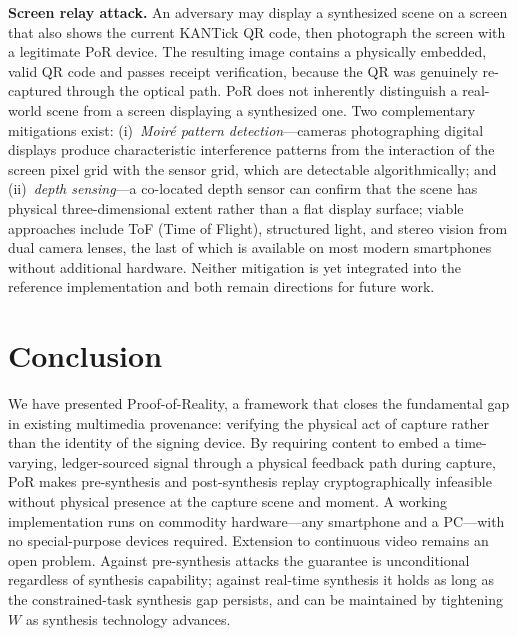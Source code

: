 \documentclass[11pt]{article}
\begin{document}
\textbf{Screen relay attack.} An adversary may display a synthesized scene on
a screen that also shows the current KANTick QR code, then photograph the screen
with a legitimate PoR device. The resulting image contains a physically embedded,
valid QR code and passes receipt verification, because the QR was genuinely
re-captured through the optical path. PoR does not inherently distinguish a
real-world scene from a screen displaying a synthesized one. Two complementary
mitigations exist: (i)~\emph{Moiré pattern detection}---cameras photographing
digital displays produce characteristic interference patterns from the
interaction of the screen pixel grid with the sensor grid, which are detectable
algorithmically; and (ii)~\emph{depth sensing}---a co-located depth sensor can confirm that the
scene has physical three-dimensional extent rather than a flat display surface;
viable approaches include ToF (Time of Flight), structured light, and stereo
vision from dual camera lenses, the last of which is available on most modern
smartphones without additional hardware. Neither mitigation is yet integrated
into the reference implementation and both remain directions for future work.

\section{Conclusion}

We have presented Proof-of-Reality, a framework that closes the fundamental gap
in existing multimedia provenance: verifying the physical act of capture rather
than the identity of the signing device. By requiring content to embed a
time-varying, ledger-sourced signal through a physical feedback path during
capture, PoR makes pre-synthesis and post-synthesis replay cryptographically
infeasible without physical presence at the capture scene and moment. A working implementation runs on commodity hardware---any smartphone and a
PC---with no special-purpose devices required. Extension to continuous video remains an open problem. Against pre-synthesis attacks the guarantee is unconditional regardless of synthesis capability; against real-time synthesis it holds as long as the constrained-task synthesis gap persists, and can be maintained by tightening~$W$ as synthesis technology advances.

\end{document}
